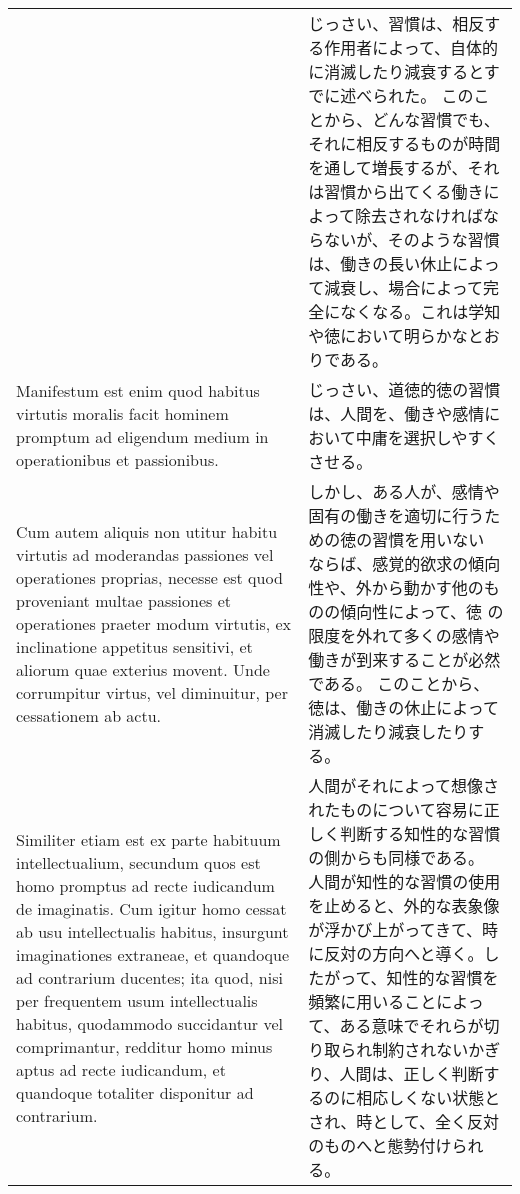 \documentclass[10pt]{jsarticle} %
\begin{document}
\begin{longtable}{p{21em}p{21em}}
&

じっさい、習慣は、相反する作用者によって、自体的に消滅したり減衰するとすでに述べられた。
このことから、どんな習慣でも、それに相反するものが時間を通して増長するが、それは習慣から出てくる働きによって除去されなければならないが、そのような習慣は、働きの長い休止によって減衰し、場合によって完全になくなる。これは学知や徳において明らかなとおりである。

\\


Manifestum est enim quod habitus virtutis moralis facit
hominem promptum ad eligendum medium in operationibus et
passionibus. 


&

じっさい、道徳的徳の習慣は、人間を、働きや感情において中庸を選択しやすくさせる。


\\


Cum autem aliquis non utitur habitu virtutis ad
moderandas passiones vel operationes proprias, necesse est quod
proveniant multae passiones et operationes praeter modum virtutis, ex
inclinatione appetitus sensitivi, et aliorum quae exterius
movent. Unde corrumpitur virtus, vel diminuitur, per cessationem ab
actu.


&

しかし、ある人が、感情や固有の働きを適切に行うための徳の習慣を用いない
ならば、感覚的欲求の傾向性や、外から動かす他のものの傾向性によって、徳
の限度を外れて多くの感情や働きが到来することが必然である。
このことから、徳は、働きの休止によって消滅したり減衰したりする。

\\

Similiter etiam est ex parte habituum intellectualium, secundum
quos est homo promptus ad recte iudicandum de imaginatis. 
Cum igitur
homo cessat ab usu intellectualis habitus, insurgunt imaginationes
extraneae, et quandoque ad contrarium ducentes; ita quod, nisi per
frequentem usum intellectualis habitus, quodammodo succidantur vel
comprimantur, redditur homo minus aptus ad recte iudicandum, et
quandoque totaliter disponitur ad contrarium. 


&

人間がそれによって想像されたものについて容易に正しく判断する知性的な習慣の側からも同様である。
人間が知性的な習慣の使用を止めると、外的な表象像が浮かび上がってきて、時に反対の方向へと導く。したがって、知性的な習慣を頻繁に用いることによって、ある意味でそれらが切り取られ制約されないかぎり、人間は、正しく判断するのに相応しくない状態とされ、時として、全く反対のものへと態勢付けられる。




\end{longtable}
\end{document}
